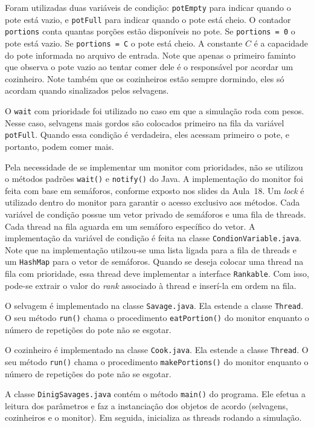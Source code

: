 \documentclass[11pt,a4paper]{article}
\begin{document}
Foram utilizadas duas variáveis de condição: \verb|potEmpty| para indicar quando o pote está vazio, 
e \verb|potFull| para indicar quando o pote está cheio. O contador \verb|portions| conta quantas 
porções estão disponíveis no pote. Se \verb|portions = 0| o pote está vazio. Se 
\verb|portions = C| o pote está cheio. A constante $C$ é a capacidade do pote informada no arquivo 
de entrada. Note que apenas o primeiro faminto que observa o pote vazio ao tentar comer dele é o 
responsável por acordar um cozinheiro. Note também que os cozinheiros estão sempre dormindo, eles só 
acordam quando sinalizados pelos selvagens.

O \verb|wait| com prioridade foi utilizado no caso em que a simulação roda com pesos. Nesse caso, 
selvagens mais gordos são colocados primeiro na fila da variável \verb|potFull|. Quando essa 
condição é verdadeira, eles acessam primeiro o pote, e portanto, podem comer mais.

Pela necessidade de se implementar um monitor com prioridades, não se utilizou o métodos padrões
\verb|wait()| e \verb|notify()| do Java. A implementação do monitor foi feita com base em semáforos,
conforme exposto nos slides da Aula~18. Um {\it lock} é utilizado dentro do  monitor para garantir o
acesso exclusivo aos métodos. Cada variável de condição possue um vetor  privado de semáforos e uma
fila de threads. Cada thread na fila aguarda em um semáforo específico do  vetor. A implementação da
variável de condição é feita na classe \verb|CondionVariable.java|. Note  que na implementação
utilzou-se uma lista ligada para a fila de threads e um \verb|HashMap| para o vetor de semáforos.
Quando se deseja colocar uma thread na fila com prioridade, essa thread deve  implementar a
interface \verb|Rankable|. Com isso, pode-se extrair o valor do {\it rank} associado à thread e
inserí-la em ordem na fila.

O selvagem é implementado na classe \verb|Savage.java|. Ela estende a classe \verb|Thread|. O seu 
método \verb|run()| chama o procedimento \verb|eatPortion()| do monitor enquanto o número de 
repetições do pote não se esgotar.

O cozinheiro é implementado na classe \verb|Cook.java|. Ela estende a classe \verb|Thread|. O seu 
método \verb|run()| chama o procedimento \verb|makePortions()| do monitor enquanto o número de 
repetições do pote não se esgotar.

A classe \verb|DinigSavages.java| contém o método \verb|main()| do programa. Ele efetua a leitura
dos parâmetros e faz a instanciação dos objetos de acordo (selvagens, cozinheiros e o monitor). 
Em seguida, inicializa as threads rodando a simulação.
\end{document}
